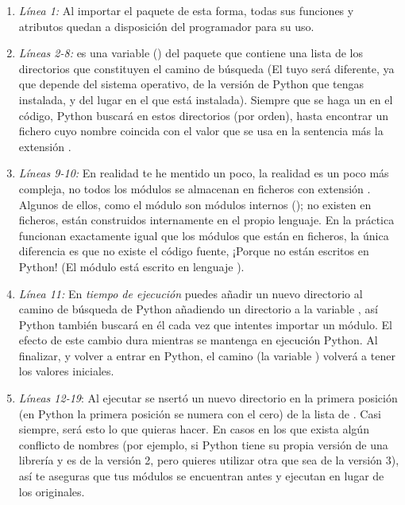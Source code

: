 \begin{enumerate}

\item \emph{Línea 1:} Al importar el paquete  de esta forma, todas sus funciones y atributos quedan a disposición del programador para su uso.

\item \emph{Líneas 2-8:}  es una variable () del paquete  que contiene una lista de los directorios que constituyen el camino de búsqueda (El tuyo será diferente, ya que depende del sistema operativo, de la versión de Python que tengas instalada, y del lugar en el que está instalada). Siempre que se haga un  en el código, Python buscará en estos directorios (por orden), hasta encontrar un fichero cuyo nombre coincida con el valor que se usa en la sentencia  más la extensión .

\item \emph{Líneas 9-10:} En realidad te he mentido un poco, la realidad es un poco más compleja, no todos los módulos se almacenan en ficheros con extensión . Algunos de ellos, como el módulo  son módulos internos (); no existen en ficheros, están construidos internamente en el propio lenguaje. En la práctica funcionan exactamente igual que los módulos que están en ficheros, la única diferencia es que no existe el código fuente, ¡Porque no están escritos en Python! (El módulo  está escrito en lenguaje ).

\item \emph{Línea 11:} En \emph{tiempo de ejecución} puedes añadir un nuevo directorio al camino de búsqueda de Python añadiendo un directorio a la variable , así Python también buscará en él cada vez que intentes importar un módulo. El efecto de este cambio dura mientras se mantenga en ejecución Python. Al finalizar, y volver a entrar en Python, el camino (la variable ) volverá a tener los valores iniciales.

\item \emph{Líneas 12-19}: Al ejecutar  se nsertó un nuevo directorio en la primera posición (en Python la primera posición se numera con el cero) de la lista de . Casi siempre, será esto lo que quieras hacer. En casos en los que exista algún conflicto de nombres (por ejemplo, si Python tiene su propia versión de una librería y es de la versión 2, pero quieres utilizar otra que sea de la versión 3), así te aseguras que tus módulos se encuentran antes y ejecutan en lugar de los originales.

\end{enumerate}

